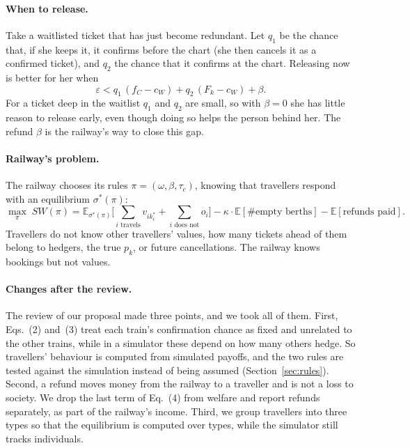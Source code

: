 \documentclass{article}
\theoremstyle{definition}
\begin{document}
\paragraph{When to release.} Take a waitlisted ticket that has just become redundant. Let
$q_1$ be the chance that, if she keeps it, it confirms before the chart (she then cancels
it as a confirmed ticket), and $q_2$ the chance that it confirms at the chart. Releasing
now is better for her when
\begin{equation}
\varepsilon < q_1\,(f_C - c_W) + q_2\,(F_k - c_W) + \beta .
\label{eq:release}
\end{equation}
For a ticket deep in the waitlist $q_1$ and $q_2$ are small, so with $\beta=0$ she has
little reason to release early, even though doing so helps the person behind her. The
refund $\beta$ is the railway's way to close this gap.

\paragraph{Railway's problem.} The railway chooses its rules $\pi=(\omega,\beta,\tau_c)$,
knowing that travellers respond with an equilibrium $\sigma^*(\pi)$:
\begin{equation}
\max_\pi\; SW(\pi) = \mathbb{E}_{\sigma^*(\pi)}\Big[\sum_{i \text{ travels}} v_{ik_i^*}
 + \!\!\sum_{i \text{ does not}}\!\! o_i\Big] - \kappa\cdot\mathbb{E}[\#\text{empty berths}]
 - \mathbb{E}[\text{refunds paid}].
\label{eq:welfare}
\end{equation}
Travellers do not know other travellers' values, how many tickets ahead of them belong to
hedgers, the true $p_k$, or future cancellations. The railway knows bookings but not
values.

\paragraph{Changes after the review.} The review of our proposal made three points, and we
took all of them. First, Eqs.~(2) and~(3) treat each train's confirmation chance as fixed
and unrelated to the other trains, while in a simulator these depend on how many others
hedge. So travellers' behaviour is computed from simulated payoffs, and the two rules are
tested against the simulation instead of being assumed (Section~\ref{sec:rules}). Second, a
refund moves money from the railway to a traveller and is not a loss to society. We drop
the last term of Eq.~(4) from welfare and report refunds separately, as part of the
railway's income. Third, we group travellers into three types so that the equilibrium is
computed over types, while the simulator still tracks individuals.
\end{document}
